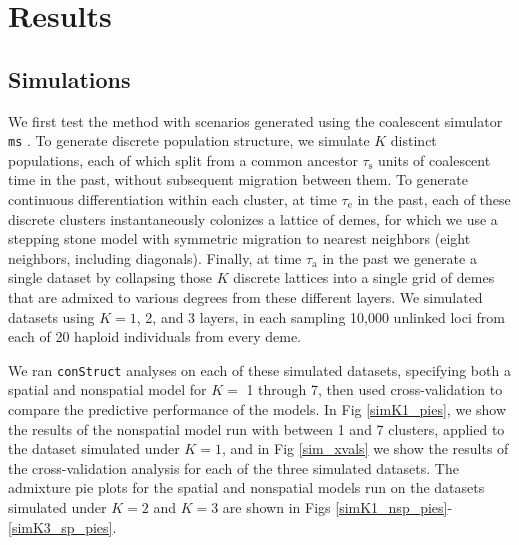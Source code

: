 \documentclass[12pt]{article}
\begin{document}
\section*{Results}

\subsection*{Simulations}
We first test the method with scenarios generated using the coalescent simulator \texttt{ms} \citep{Hudson2002}.
To generate discrete population structure, we simulate $K$ distinct populations,
each of which split from a common ancestor $\tau_{\text{s}}$ units of coalescent time in the past,
without subsequent migration between them.
To generate continuous differentiation within each cluster,
at time $\tau_{\text{e}}$ in the past,
each of these discrete clusters instantaneously colonizes a lattice of demes,
for which we use a stepping stone model with symmetric migration 
to nearest neighbors (eight neighbors, including diagonals).
Finally, at time $\tau_{\text{a}}$ in the past 
we generate a single dataset %
by collapsing those $K$ discrete lattices into a single grid of demes that are admixed to various degrees from these different layers.
We simulated datasets using $K=1$, 2, and 3 layers,
in each sampling 10,000 unlinked loci from each of 20 haploid individuals from every deme.


We ran \texttt{conStruct} analyses on each of these simulated datasets, 
specifying both a spatial and nonspatial model for $K = $ 1 through 7, 
then used cross-validation to compare the predictive performance of the models.
In Fig \ref{simK1_pies}, we show the results of the nonspatial model 
run with between 1 and 7 clusters, applied to the dataset simulated under $K=1$,
and in Fig \ref{sim_xvals} we show the results of the cross-validation analysis for each of the three simulated datasets.
The admixture pie plots for the spatial and nonspatial models run on the datasets simulated under $K=2$ and $K=3$
are shown in Figs \ref{simK1_nsp_pies}-\ref{simK3_sp_pies}.
\end{document}
